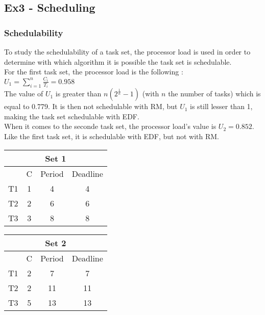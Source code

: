 \subsection{Ex3 - Scheduling}

\subsubsection{Schedulability}

To study the schedulability of a task set, the processor load is used in order to determine with which algorithm it is possible the task set is schedulable. \\

For the first task set, the processor load is the following : \\

$U_1 = \sum_{i=1}^{n} \frac{C_i}{T_i} = 0.958$ \\

The value of $U_1$ is greater than $n(2^{\frac{1}{n}}-1)$ (with $n$ the number of tasks) which is equal to 0.779. It is then not schedulable with RM, but $U_1$ is still lesser than 1, making the task set schedulable with EDF. \\

When it comes to the seconde task set, the processor load's value is $U_2 = 0.852$. Like the first task set, it is schedulable with EDF, but not with RM. \\

\begin{center}
	\begin{tabular}{|c|c|c|c|}
		\hline
		\multicolumn{4}{|c|}{\textbf{Set 1}} \\
		\hline
		\, & C & Period & Deadline \\
		\hline
		T1 & 1 & 4 & 4 \\
		\hline
		T2 & 2 & 6 & 6 \\
		\hline
		T3 & 3 & 8 & 8 \\
		\hline
	\end{tabular}
	\quad
	\begin{tabular}{|c|c|c|c|}
		\hline
		\multicolumn{4}{|c|}{\textbf{Set 2}} \\
		\hline
		\, & C & Period & Deadline \\
		\hline
		T1 & 2 & 7 & 7 \\
		\hline
		T2 & 2 & 11 & 11 \\
		\hline
		T3 & 5 & 13 & 13 \\
		\hline
	\end{tabular}
\end{center}

